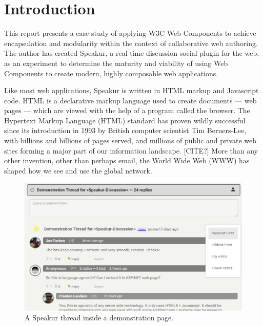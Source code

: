 \chapter{Introduction}
%

%
%

This report presents a case study of applying W3C Web Components 
to achieve encapsulation and modularity within the context of collaborative web authoring. 
The author has created Speakur, a real-time discussion social plugin for the web, 
as an experiment to determine the maturity and viability of using Web Components to create modern, highly composable web applications.

Like most web applications, Speakur is written in HTML markup and Java\-script code. 
HTML is a declarative markup language used to create documents --- web pages --- which are viewed with the help of a program called the browser. 
The Hyper\-text Markup Language (HTML) 
standard has proven wildly successful since its introduction in 1993 by British computer scientist 
Tim Berners-Lee, 
with billions and billions of pages served, 
and millions of public and private web sites forming a major part of our information landscape. [CITE?]
More than any other invention, other than perhaps email, the World Wide Web (WWW) has shaped how we see and use the global network.

% 
\begin{figure}[htb]
\centering
 \includegraphics[width=6in]{images/screenshot_20150312_1630_v2.png}
\caption{A Speakur thread inside a demonstration page.}
\label{f:demo1}
\end{figure}
%

